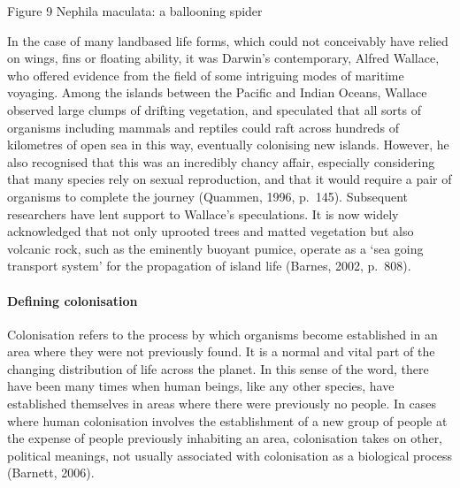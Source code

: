 \documentclass[letterpaper,10pt,english]{sphinxmanual}
\let\sphinxpxdimen\pdfpxdimen\else\newdimen\sphinxpxdimen
\begin{document}
\sphinxincludegraphics[width=287\sphinxpxdimen,height=369\sphinxpxdimen]{{dd205_3_009i}.jpg}

Figure 9 Nephila maculata: a ballooning spider

In the case of many land\sphinxhyphen{}based life forms, which could not conceivably have relied on wings, fins or floating ability, it was Darwin’s contemporary, Alfred Wallace, who offered evidence from the field of some intriguing modes of maritime voyaging. Among the islands between the Pacific and Indian Oceans, Wallace observed large clumps of drifting vegetation, and speculated that all sorts of organisms \textendash{} including mammals and reptiles \textendash{} could raft across hundreds of kilometres of open sea in this
way, eventually colonising new islands. However, he also recognised that this was an incredibly chancy affair, especially considering that many species rely on sexual reproduction, and that it would require a pair of organisms to complete the journey (Quammen, 1996, p. 145). Subsequent researchers have lent support to Wallace’s speculations. It is now widely acknowledged that not only uprooted trees and matted vegetation but also volcanic rock, such as the eminently buoyant pumice, operate as a
‘sea going transport system’ for the propagation of island life (Barnes, 2002, p. 808).


\paragraph{Defining colonisation}
\label{\detokenize{content/session_00/Part_00_03:Defining-colonisation}}
Colonisation refers to the process by which organisms become established in an area where they were not previously found. It is a normal and vital part of the changing distribution of life across the planet. In this sense of the word, there have been many times when human beings, like any other species, have established themselves in areas where there were previously no people. In cases where human colonisation involves the establishment of a new group of people at the expense of people
previously inhabiting an area, colonisation takes on other, political meanings, not usually associated with colonisation as a biological process (Barnett, 2006).
\end{document}
